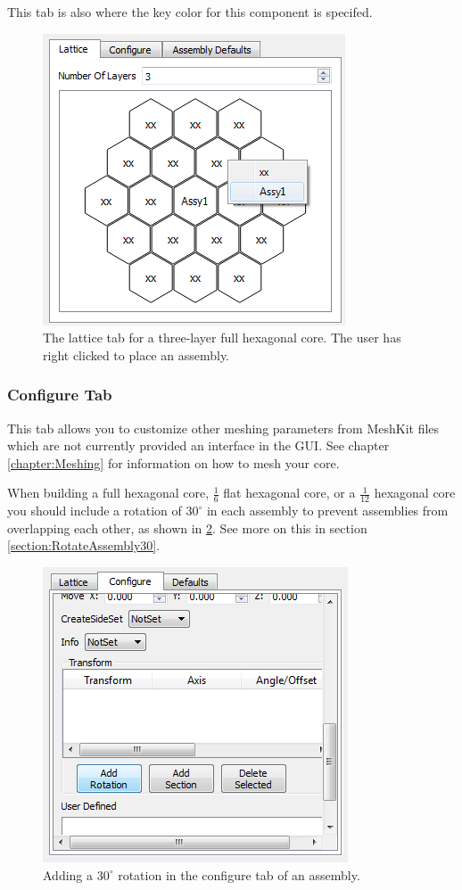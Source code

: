 This tab is also where the key color for this component is specifed.

\begin{figure}[h]
	\begin{center}
		\includegraphics[width=0.3\linewidth]{Images/hex-19.png}
		\caption{The lattice tab for a three-layer full hexagonal core.  The user has right clicked to place an assembly.}
		\label{fig:latticetab}
	\end{center}
\end{figure}

\subsubsection{Configure Tab}
This tab allows you to customize other meshing parameters from MeshKit files which are not currently provided an interface in the GUI. See chapter \ref{chapter:Meshing} for information on how to mesh your core.

When building a full hexagonal core, $\frac{1}{6}$ flat hexagonal core, or a $\frac{1}{12}$ hexagonal core you should include a rotation of $30^\circ$ in each assembly to prevent assemblies from overlapping each other, as shown in \ref{fig:configuretab}.  See more on this in section \ref{section:RotateAssembly30}.

\begin{figure}[h]
	\begin{center}
		\includegraphics[width=0.4\linewidth]{Images/hex-16.png}
		\caption{Adding a $30^\circ$ rotation in the configure tab of an assembly.}
		\label{fig:configuretab}
	\end{center}
\end{figure}

